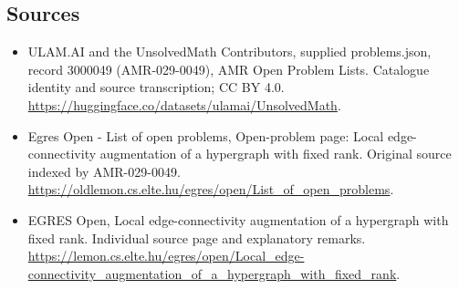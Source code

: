 \documentclass[11pt,a4paper]{article}
\begin{document}
\subsection{Sources}
\begin{itemize}
\item[S1] ULAM.AI and the UnsolvedMath Contributors, supplied problems.json, record 3000049 (AMR-029-0049), AMR Open Problem Lists. Catalogue identity and source transcription; CC BY 4.0.
\url{https://huggingface.co/datasets/ulamai/UnsolvedMath}.
\item[S2] Egres Open - List of open problems, Open-problem page: Local edge-connectivity augmentation of a hypergraph with fixed rank. Original source indexed by AMR-029-0049.
\url{https://oldlemon.cs.elte.hu/egres/open/List_of_open_problems}.
\item[S3] EGRES Open, Local edge-connectivity augmentation of a hypergraph with fixed rank. Individual source page and explanatory remarks.
\url{https://lemon.cs.elte.hu/egres/open/Local_edge-connectivity_augmentation_of_a_hypergraph_with_fixed_rank}.
\end{itemize}
\end{document}
